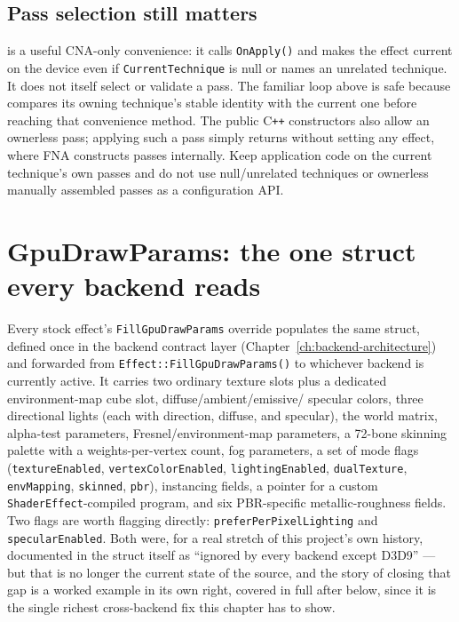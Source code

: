 \subsection{Pass selection still matters}

 is a useful CNA-only convenience: it calls \texttt{OnApply()} and
makes the effect current on the device even if \texttt{CurrentTechnique} is null or names an
unrelated technique. It does not itself select or validate a pass. The familiar loop above is
safe because  compares its owning technique's stable identity with
the current one before reaching that convenience method. The public C\texttt{++} constructors
also allow an ownerless pass; applying such a pass simply returns without setting any effect,
where FNA constructs passes internally. Keep application code on the current technique's own
passes and do not use null/unrelated techniques or ownerless manually assembled passes as a
configuration API.

\section{GpuDrawParams: the one struct every backend reads}

Every stock effect's \texttt{FillGpuDrawParams} override populates the same struct, defined
once in the backend contract layer (Chapter~\ref{ch:backend-architecture}) and forwarded from
\texttt{Effect::FillGpuDrawParams()} to whichever backend is currently active. It carries two
ordinary texture slots plus a dedicated environment-map cube slot, diffuse/ambient/emissive/%
specular colors, three directional lights (each with direction, diffuse, and specular),
the world matrix, alpha-test parameters, Fresnel/environment-map parameters, a 72-bone
skinning palette with a weights-per-vertex count, fog parameters, a set of mode flags
(\texttt{textureEnabled}, \texttt{vertexColorEnabled}, \texttt{lightingEnabled},
\texttt{dualTexture}, \texttt{envMapping}, \texttt{skinned}, \texttt{pbr}), instancing fields,
a pointer for a custom \texttt{ShaderEffect}-compiled program, and six PBR-specific
metallic-roughness fields. Two flags are worth flagging directly: \texttt{preferPerPixelLighting}
and \texttt{specularEnabled}. Both were, for a real stretch of this project's own history,
documented in the struct itself as ``ignored by every backend except D3D9'' --- but that is no
longer the current state of the source, and the story of closing that gap is a worked example
in its own right, covered in full after  below, since it is the single
richest cross-backend fix this chapter has to show.

